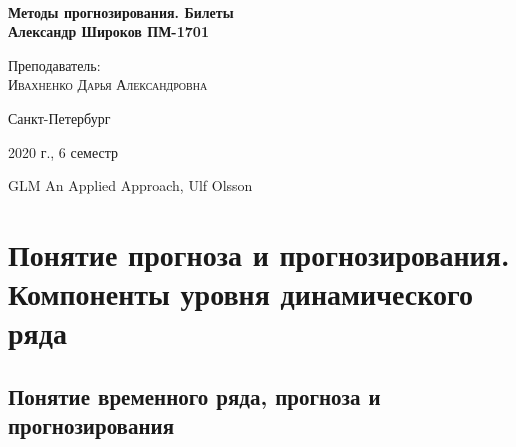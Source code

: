 \documentclass[aps,%
12pt,%
final,%
oneside,
onecolumn,%
musixtex, %
superscriptaddress,%
centertags]{article} %
\theoremstyle{plain}
\theoremstyle{definition}
\theoremstyle{remark}
\begin{document}
\begin{titlepage} 
\begin{center}
 
\textbf{}\\[10.0cm]
\textbf{\LARGE Методы прогнозирования. Билеты}\\[0.5cm]
\textbf{\Large Александр Широков ПМ-1701} \\[0.2cm]

\begin{center} \large
{Преподаватель:} \\[0.5cm]
\textsc {Ивахненко Дарья Александровна}\\
\end{center}
\vfill 


{\large {Санкт-Петербург}} \par
{\large {2020 г., 6 семестр}}
\end{center} 
\end{titlepage}

\begin{thebibliography}{3}
	GLM An Applied Approach, Ulf Olsson
\end{thebibliography}
\tableofcontents
\newpage

\section{Понятие прогноза и прогнозирования. Компоненты уровня динамического ряда}

\subsection{Понятие временного ряда, прогноза и прогнозирования}
\end{document}
